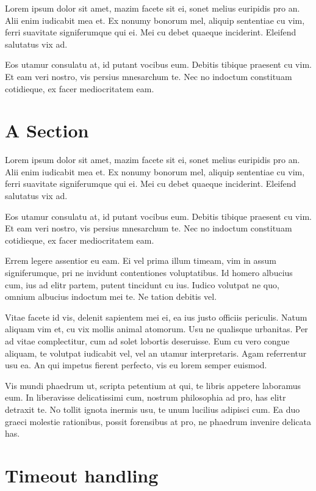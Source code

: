 \documentclass[a4paper,11pt,oneside]{report}
\begin{document}
Lorem ipsum dolor sit amet, mazim facete sit ei, sonet melius euripidis pro
an. Alii enim iudicabit mea et. Ex nonumy bonorum mel, aliquip sententiae cu
vim, ferri suavitate signiferumque qui ei. Mei cu debet quaeque
inciderint. Eleifend salutatus vix ad.

Eos utamur consulatu at, id putant vocibus eum. Debitis tibique praesent cu
vim. Et eam veri nostro, vis persius mnesarchum te. Nec no indoctum constituam
cotidieque, ex facer mediocritatem eam.


\section{A Section}

Lorem ipsum dolor sit amet, mazim facete sit ei, sonet melius euripidis pro
an. Alii enim iudicabit mea et. Ex nonumy bonorum mel, aliquip sententiae cu
vim, ferri suavitate signiferumque qui ei. Mei cu debet quaeque
inciderint. Eleifend salutatus vix ad.

Eos utamur consulatu at, id putant vocibus eum. Debitis tibique praesent cu
vim. Et eam veri nostro, vis persius mnesarchum te. Nec no indoctum constituam
cotidieque, ex facer mediocritatem eam.

Errem legere assentior eu eam. Ei vel prima illum timeam, vim in assum
signiferumque, pri ne invidunt contentiones voluptatibus. Id homero albucius
cum, ius ad elitr partem, putent tincidunt cu ius. Iudico volutpat ne quo,
omnium albucius indoctum mei te. Ne tation debitis vel.

Vitae facete id vis, delenit sapientem mei ei, ea ius justo officiis
periculis. Natum aliquam vim et, cu vix mollis animal atomorum. Usu ne qualisque
urbanitas. Per ad vitae complectitur, cum ad solet lobortis deseruisse. Eum cu
vero congue aliquam, te volutpat iudicabit vel, vel an utamur
interpretaris. Agam referrentur usu ea. An qui impetus fierent perfecto, vis eu
lorem semper euismod.

Vis mundi phaedrum ut, scripta petentium at qui, te libris appetere laboramus
eum. In liberavisse delicatissimi cum, nostrum philosophia ad pro, has elitr
detraxit te. No tollit ignota inermis usu, te unum lucilius adipisci cum. Ea duo
graeci molestie rationibus, possit forensibus at pro, ne phaedrum invenire
delicata has.

\section{Timeout handling}
\end{document}

